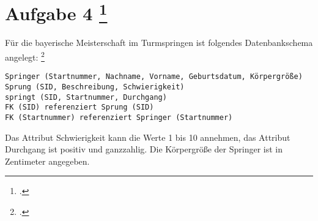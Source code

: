 \documentclass{lehramt-informatik-aufgabe}
\begin{document}

\section{Aufgabe 4
\footcite[Thema 2 Teilaufgabe 2 Aufgabe 4]{examen:46116:2017:09}}

\noindent
Für die bayerische Meisterschaft im Turmspringen ist folgendes
Datenbankschema angelegt:
\footcite[SQL-Anfragen auf mehreren Tabellen]{db:ab:2}

\begin{verbatim}
Springer (Startnummer, Nachname, Vorname, Geburtsdatum, Körpergröße)
Sprung (SID, Beschreibung, Schwierigkeit)
springt (SID, Startnummer, Durchgang)
FK (SID) referenziert Sprung (SID)
FK (Startnummer) referenziert Springer (Startnummer)
\end{verbatim}

\noindent
Das Attribut Schwierigkeit kann die Werte 1 bis 10 annehmen, das
Attribut Durchgang ist positiv und ganzzahlig. Die Körpergröße der
Springer ist in Zentimeter angegeben.
\end{document}
